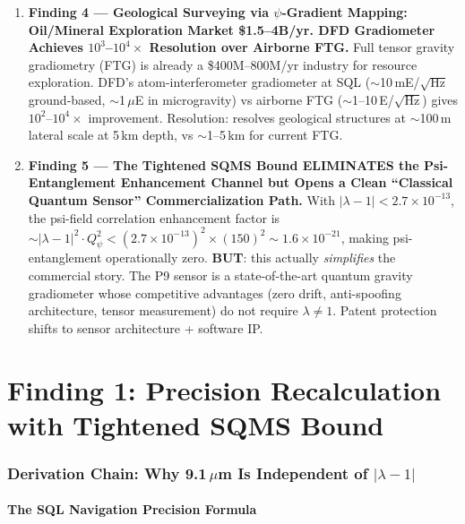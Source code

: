 \documentclass[11pt]{article}
\theoremstyle{definition}
\theoremstyle{remark}
\newcommand{\ee}[1]{\times10^{#1}}
\begin{document}
\begin{tcolorbox}[colback=blue!5!white, colframe=blue!70!black,
  title=\textbf{W4i19 TOP 5 FINDINGS (Ranked by Impact)}]
\begin{enumerate}
\item \textbf{Finding 4 --- Geological Surveying via $\psi$-Gradient
  Mapping: Oil/Mineral Exploration Market \$1.5--4B/yr. DFD Gradiometer
  Achieves $10^3$--$10^4\times$ Resolution over Airborne FTG.} Full
  tensor gravity gradiometry (FTG) is already a \$400M--800M/yr industry
  for resource exploration. DFD's atom-interferometer gradiometer at SQL
  ($\sim$10\,mE/$\sqrt{\text{Hz}}$ ground-based, $\sim$1\,$\mu$E in
  microgravity) vs airborne FTG ($\sim$1--10\,E/$\sqrt{\text{Hz}}$)
  gives $10^2$--$10^4\times$ improvement. Resolution: resolves
  geological structures at $\sim$100\,m lateral scale at 5\,km depth,
  vs $\sim$1--5\,km for current FTG.

\item \textbf{Finding 5 --- The Tightened SQMS Bound ELIMINATES the
  Psi-Entanglement Enhancement Channel but Opens a Clean ``Classical
  Quantum Sensor'' Commercialization Path.} With $|\lambda-1| < 2.7\ee{-13}$,
  the psi-field correlation enhancement factor is
  $\sim |\lambda-1|^2 \cdot Q_\psi^2 < (2.7\ee{-13})^2 \times (150)^2
  \sim 1.6\ee{-21}$, making psi-entanglement operationally zero.
  \textbf{BUT}: this actually \emph{simplifies} the commercial story.
  The P9 sensor is a state-of-the-art quantum gravity gradiometer whose
  competitive advantages (zero drift, anti-spoofing architecture, tensor
  measurement) do not require $\lambda \neq 1$. Patent protection
  shifts to sensor architecture + software IP.
\end{enumerate}
\end{tcolorbox}

\part{Finding 1: Precision Recalculation with Tightened SQMS Bound}
\label{part:precision}

\section{Derivation Chain: Why 9.1\,$\mu$m Is Independent of $|\lambda-1|$}
\label{sec:precision-derivation}

\subsection{The SQL Navigation Precision Formula}
\end{document}
